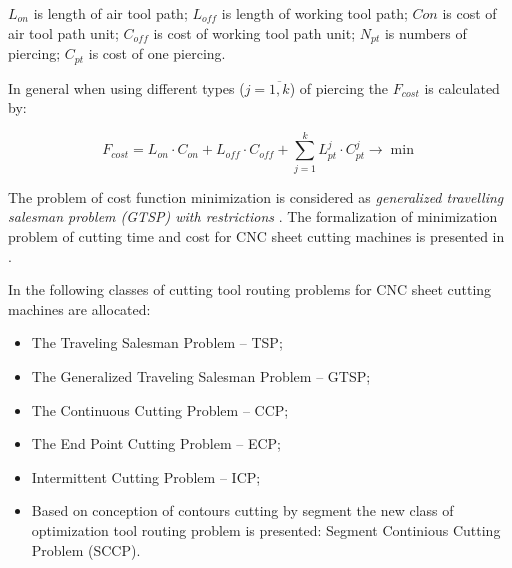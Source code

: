 \documentclass[runningheads]{llncs}
\begin{document}
$L_{on}$ is length of air tool path;
$L_{off}$ is length of working tool path;
$C{on}$ is cost of air tool path unit;
$C_{off}$ is cost of working tool path unit;
$N_{pt}$ is numbers of piercing;
$C_{pt}$ is cost of one piercing.

In general when using different types ($j = \overline{1, k}$) of piercing
the $F_{cost}$ is calculated by:

\begin{equation}
  F_{cost} =
  L_{on} \cdot C_{on} +
  L_{off} \cdot C_{off} +
  \sum_{j=1}^k L_{pt}^j \cdot C_{pt}^j
  \to \min
  \label{cost-n}
\end{equation}

The problem of cost function minimization is considered as
\textit{generalized travelling salesman problem (GTSP) with restrictions}
\cite{ru04,ru05}.
The formalization of minimization problem of cutting time and cost
for CNC sheet cutting machines is presented in \cite{ru04}.

In \cite{Dewil2016Nov,Hoeft1997Sep}
the following classes of cutting tool routing problems
for CNC sheet cutting machines are allocated:

\begin{itemize}

\item The Traveling Salesman Problem – TSP;

\item The Generalized Traveling Salesman Problem – GTSP;

\item The Continuous Cutting Problem – CCP;

\item The End Point Cutting Problem – ECP;

\item Intermittent Cutting Problem – ICP;

\item Based on conception of contours cutting by segment \cite{Petunin2015Nov}
the new class of optimization tool routing problem is presented:
Segment Continious Cutting Problem (SCCP).

\end{itemize}
\end{document}
